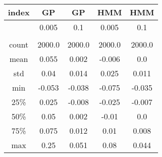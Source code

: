 \centering \begin{tabular}{c|c|c|c|c}
index	&GP	&GP	&HMM	&HMM\\\hline
	&0.005	&0.1	&0.005	&0.1\\
	&	&	&	&\\
count	&2000.0	&2000.0	&2000.0	&2000.0\\
mean	&0.055	&0.002	&-0.006	&0.0\\
std	&0.04	&0.014	&0.025	&0.011\\
min	&-0.053	&-0.038	&-0.075	&-0.035\\
25\%	&0.025	&-0.008	&-0.025	&-0.007\\
50\%	&0.05	&0.002	&-0.01	&0.0\\
75\%	&0.075	&0.012	&0.01	&0.008\\
max	&0.25	&0.051	&0.08	&0.044\\
\end{tabular}
